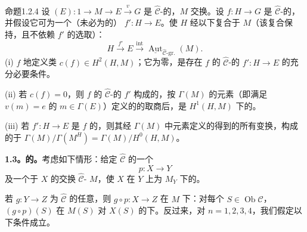 \begin{SGAresult}{命题}{1.2.4}
设 $(E):1\to M\to E\xrightarrow{v}G$ 是 $\widehat{\mathcal C}$-的，$M$ 交换。设 $f:H\to G$ 是 $\widehat{\mathcal C}$-的，并假设它可为一个（未必为的） $f':H\to E$。使 $H$ 经以下复合于 $M$（该复合保持，且不依赖 $f'$ 的选取）：
\[
 H\xrightarrow{f'}E\xrightarrow{\operatorname{int}}
 \underline{\operatorname{Aut}}_{\widehat{\mathcal C}\text{-gr.}}(M).
\]
(i)  $f$ 地定义类 $c(f)\in H^2(H,M)$；它为零，是存在 $f$ 的 $\widehat{\mathcal C}$-的 $f':H\to E$ 的充分必要条件。

(ii) 若 $c(f)=0$，则 $f$ 的 $\widehat{\mathcal C}$-的 $f'$ 构成的，按 $\Gamma(M)$ 的元素（即满足 $v(m)=e$ 的 $m\in\Gamma(E)$）定义的的取商后，是 $H^1(H,M)$ 下的。

(iii) 若 $f':H\to E$ 是 $f$ 的，则其经 $\Gamma(M)$ 中元素定义的得到的所有变换，构成的于 $\Gamma(M)/\Gamma(M^H)=\Gamma(M)/H^0(H,M)$。
\end{SGAresult}
\textbf{1.3。的。}考虑如下情形：给定 $\widehat{\mathcal C}$ 的一个
\[
 p:X\longrightarrow Y \tag{$\dagger$}
\]
及一个于 $X$ 的交换 $\widehat{\mathcal C}$- $M$，使 $X$ 在 $Y$ 上为 $M_Y$ 下的。

若 $g:Y\to Z$ 为 $\widehat{\mathcal C}$ 的任意，则 $g\circ p:X\to Z$ 在 $M$ 下：对每个 $S\in\operatorname{Ob}\mathcal C$，$(g\circ p)(S)$ 在 $M(S)$ 对 $X(S)$ 的下。反过来，对 $n=1,2,3,4$，我们假定以下条件成立。

